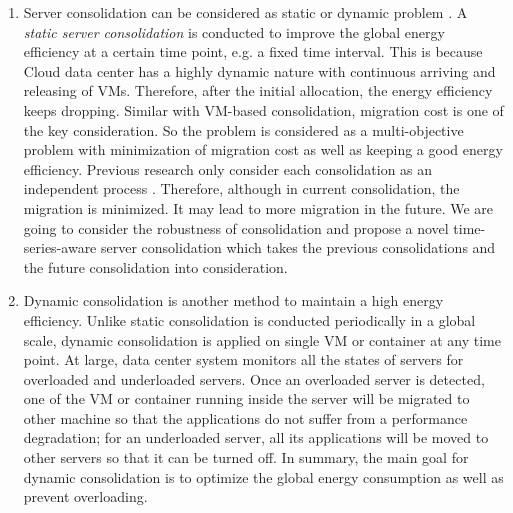 \begin{enumerate}
\item Server consolidation can be considered as static or dynamic problem \cite{Xiao:2015ik}.
A \emph{static server consolidation} is conducted to improve the global energy efficiency at a certain time point, e.g. a fixed time interval. This is because Cloud data center has a highly dynamic nature with continuous arriving and releasing of VMs. Therefore, 
after the initial allocation, the energy efficiency keeps dropping. Similar with VM-based consolidation, migration cost is one of the key consideration. So the problem is considered as a multi-objective problem with minimization of migration cost as well as keeping a good energy efficiency. Previous research only consider each consolidation as an independent process \cite{}. Therefore, although in current consolidation, the migration is minimized. It may lead to more migration in the future. We are going to consider the robustness of consolidation and propose a novel time-series-aware server consolidation which takes the previous consolidations and the future consolidation into consideration. 
\item Dynamic consolidation is another method to maintain a high energy efficiency. Unlike static consolidation is conducted periodically in a global scale, dynamic consolidation is applied on single VM or container at any time point.  At large, data center system monitors all the states of servers for overloaded and underloaded servers. Once an overloaded server is detected, one of the VM or container running inside the server will be migrated to other machine so that the applications do not suffer from a performance degradation; for an underloaded server, all its applications will be moved to other servers so that it can be turned off. In summary, the main goal for dynamic consolidation is to optimize the global energy consumption as well as prevent overloading.

\end{enumerate}
